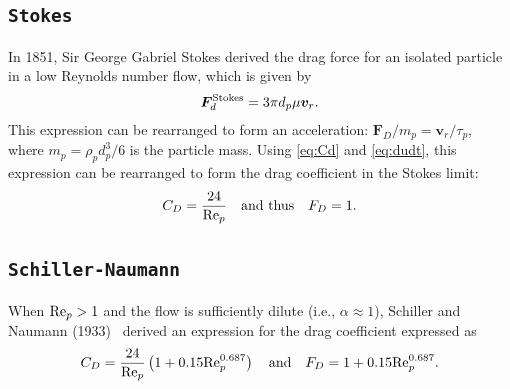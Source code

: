 \documentclass[12pt]{article}
\newcommand{\code}[1]{\texttt{#1}}
\newcommand{\Rep}{\mbox{\rm Re}_p} %
\begin{document}
\begin{appendices}
\subsection{\code{Stokes}~\cite{stokes1851effect}}
In 1851, Sir George Gabriel Stokes derived the drag force for an isolated particle in a low Reynolds number flow, which is given by
\begin{equation}
\bm{F}_d^{\rm Stokes}=3\pi d_p\mu\bm{v}_r.
\end{equation}
This expression can be rearranged to form an acceleration: $\bm{F}_D/m_p=\bm{v}_r/\tau_p$, where $m_p=\rho_p d_p^3/6$ is the particle mass. Using \eqref{eq:Cd} and \eqref{eq:dudt}, this expression can be rearranged to form the drag coefficient in the Stokes limit:
\begin{equation}
C_D = \frac{24}{\Rep}\quad \text{and thus}\quad F_D=1.
\end{equation}

\subsection{\code{Schiller-Naumann}~\cite{schiller1933fundamental}}
When ${\rm Re}_p>1$ and the flow is sufficiently dilute (i.e., $\alpha\approx 1$), Schiller and Naumann (1933)~\cite{schiller1933fundamental} derived an expression for the drag coefficient expressed as
\begin{equation}
C_D=\frac{24}{\Rep}\left(1+0.15\Rep^{0.687}\right) \quad {\rm and}\quad F_D=1+0.15\Rep^{0.687}.
\end{equation}


\end{appendices}
\end{document}
